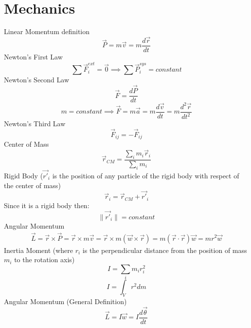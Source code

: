 \documentclass{article}
\begin{document}
\section{Mechanics}
Linear Momentum definition
\begin{equation}
  \vec{P} = m\vec{v} = m\frac{d\vec{r}}{dt}
\end{equation}
Newton's First Law
\begin{equation}
  \sum \vec{F}_i^{ext} = \vec{0} \implies \sum \vec{P}_i^{sys} = constant
\end{equation}
Newton's Second Law
\begin{equation}
  \vec{F} = \frac{d\vec{P}}{dt} 
\end{equation}
\begin{equation}
  m = constant \implies \vec{F} = m\vec{a} = m\frac{d\vec{v}}{dt}= m\frac{d^2\vec{r}}{dt^2}
\end{equation}
Newton's Third Law
\begin{equation}
  \vec{F}_{ij} = - \vec{F}_{ij}
\end{equation}
Center of Mass
\begin{equation}
  \vec{r}_{CM} = \frac{\sum_i m_i\vec{r}_i}{\sum_i m_i}
\end{equation}
Rigid Body ($\vec{r'}_i$ is the position of any particle of the rigid body with respect of the center of mass)
\begin{equation}
  \vec{r}_i = \vec{r}_{CM} + \vec{r'}_i
\end{equation}
Since it is a rigid body then:
\begin{equation}
  \|\vec{r'}_i\| = constant
\end{equation}
Angular Momentum
\begin{equation}
  \begin{split}
    \vec{L} = \vec{r} \times \vec{P} =\vec{r} \times m\vec{v} = \vec{r} \times m(\vec{w} \times \vec{r}) = m(\vec{r}\cdot \vec{r}) \vec{w} = mr^2 \vec{w}
  \end{split}
\end{equation}
Inertia Moment (where $r_i$ is the perpendicular distance from the position of mass $m_i$ to the rotation axis)
\begin{equation}
  I = \sum_i m_ir_i^2
\end{equation}
\begin{equation}
  I = \int_V r^2dm
\end{equation}
Angular Momentum (General Definition)
\begin{equation}
  \vec{L} = I\vec{w} = I\frac{d\vec{\theta}}{dt}
\end{equation}
\end{document}
